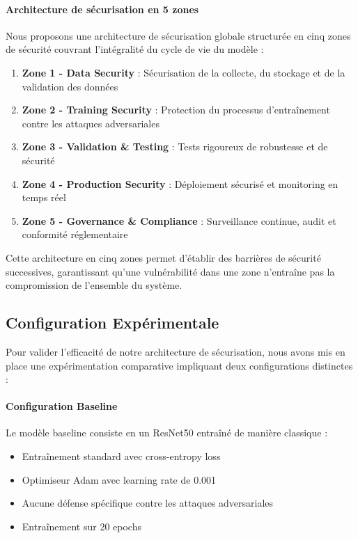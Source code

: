 \paragraph{Architecture de sécurisation en 5 zones}
Nous proposons une architecture de sécurisation globale structurée en cinq zones de sécurité couvrant l'intégralité du cycle de vie du modèle :

\begin{enumerate}
    \item \textbf{Zone 1 - Data Security} : Sécurisation de la collecte, du stockage et de la validation des données
    \item \textbf{Zone 2 - Training Security} : Protection du processus d'entraînement contre les attaques adversariales
    \item \textbf{Zone 3 - Validation \& Testing} : Tests rigoureux de robustesse et de sécurité
    \item \textbf{Zone 4 - Production Security} : Déploiement sécurisé et monitoring en temps réel
    \item \textbf{Zone 5 - Governance \& Compliance} : Surveillance continue, audit et conformité réglementaire
\end{enumerate}

Cette architecture en cinq zones permet d'établir des barrières de sécurité successives, garantissant qu'une vulnérabilité dans une zone n'entraîne pas la compromission de l'ensemble du système.

\subsection{Configuration Expérimentale}

Pour valider l'efficacité de notre architecture de sécurisation, nous avons mis en place une expérimentation comparative impliquant deux configurations distinctes :

\paragraph{Configuration Baseline}
Le modèle baseline consiste en un ResNet50 entraîné de manière classique :
\begin{itemize}
    \item Entraînement standard avec cross-entropy loss
    \item Optimiseur Adam avec learning rate de 0.001
    \item Aucune défense spécifique contre les attaques adversariales
    \item Entraînement sur 20 epochs
\end{itemize}


